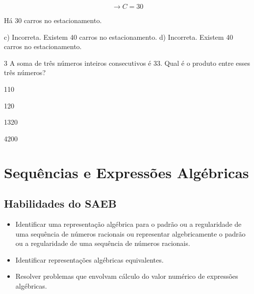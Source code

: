 \begin{escolha}
\begin{boxmedio}
\begin{boxmedio}
{\begin{boxpeq}
\begin{boxpeq}
{\begin{boxpeq}
\begin{boxmedio}
\begin{boxmedio}
\begin{boxpeq}
\begin{boxmedio}
\begin{boxpeq}
\begin{boxpeq}
\begin{boxpeq}
\begin{boxpeq}
\begin{boxmedio}
{\begin{boxmedio}
\begin{boxmedio}
\begin{boxpeq}
\begin{boxmedio}
\begin{boxpeq}
\begin{boxpeq}
\begin{boxpeq}
\begin{escolha}
{\begin{displaymath}
\rightarrow

C = 30
\end{displaymath}

Há 30 carros no estacionamento.

c) Incorreta. Existem 40 carros no estacionamento. 
d) Incorreta. Existem 40 carros no estacionamento. 
}

\num{3} A soma de três números inteiros consecutivos é 33. Qual é o produto
entre esses três números?

\begin{escolha}
  \item 110

  \item 120

  \item 1320

  \item 4200
\end{escolha}


\chapter{Sequências e Expressões Algébricas}

\section{Habilidades do SAEB}

\begin{itemize}

  \item Identificar uma representação algébrica para o padrão ou a
regularidade de uma sequência de números racionais ou representar
algebricamente o padrão ou a regularidade de uma sequência de
números racionais. 
  \item Identificar representações algébricas equivalentes. 
  \item Resolver problemas que envolvam cálculo do valor numérico de
expressões algébricas. 


\end{itemize}
\end{escolha}
\end{boxpeq}
\end{boxpeq}
\end{boxpeq}
\end{boxmedio}
\end{boxpeq}
\end{boxmedio}
\end{boxmedio}}
\end{boxmedio}
\end{boxpeq}
\end{boxpeq}
\end{boxpeq}
\end{boxpeq}
\end{boxmedio}
\end{boxpeq}
\end{boxmedio}
\end{boxmedio}
\end{boxpeq}}
\end{boxpeq}
\end{boxpeq}}
\end{boxmedio}
\end{boxmedio}
\end{escolha}
